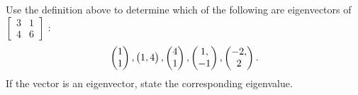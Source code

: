 {%
\begin{problem}\label{use definition of eigenvectors}
Use the definition above to determine which of the following are eigenvectors of
$
\begin{bmatrix}
 3 & 1 \\
 4 & 6
\end{bmatrix}
$
:
$$\begin{pmatrix} 1\\1 \end{pmatrix}, \begin{pmatrix} 1,4 \end{pmatrix}, \begin{pmatrix} 4\\1 \end{pmatrix}, \begin{pmatrix} 1,\\-1 \end{pmatrix}, \begin{pmatrix} -2,\\2 \end{pmatrix}.$$   
If the vector is an eigenvector, state the corresponding eigenvalue.
\end{problem}



}
